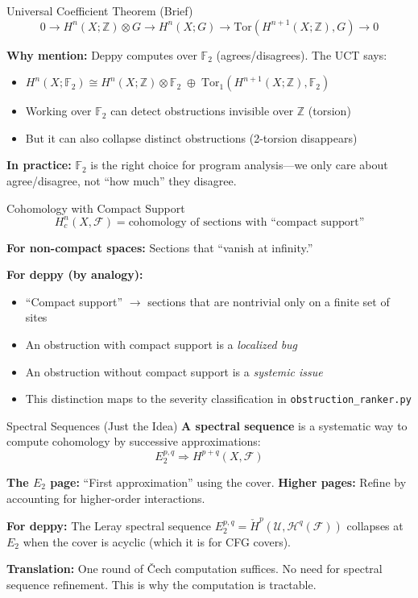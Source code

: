 \documentclass[aspectratio=169,10pt]{beamer}
\newcommand{\Fscr}{\mathcal{F}}
\newcommand{\Uscr}{\mathcal{U}}
\begin{document}
\begin{frame}{Universal Coefficient Theorem (Brief)}
\[
0 \to H^n(X; \mathbb{Z}) \otimes G \to H^n(X; G) \to \mathrm{Tor}(H^{n+1}(X; \mathbb{Z}), G) \to 0
\]

\textbf{Why mention:} Deppy computes over $\mathbb{F}_2$ (agrees/disagrees). The UCT says:
\begin{itemize}
  \item $H^n(X; \mathbb{F}_2) \cong H^n(X; \mathbb{Z}) \otimes \mathbb{F}_2 \;\oplus\; \text{Tor}_1(H^{n+1}(X; \mathbb{Z}), \mathbb{F}_2)$
  \item Working over $\mathbb{F}_2$ can detect obstructions invisible over $\mathbb{Z}$ (torsion)
  \item But it can also collapse distinct obstructions (2-torsion disappears)
\end{itemize}

\textbf{In practice:} $\mathbb{F}_2$ is the right choice for program analysis---we only care about agree/disagree, not ``how much'' they disagree.
\end{frame}

\begin{frame}{Cohomology with Compact Support}
\[
H^n_c(X, \Fscr) = \text{cohomology of sections with ``compact support''}
\]

\textbf{For non-compact spaces:} Sections that ``vanish at infinity.''

\textbf{For deppy (by analogy):}
\begin{itemize}
  \item ``Compact support'' $\to$ sections that are nontrivial only on a finite set of sites
  \item An obstruction with compact support is a \emph{localized bug}
  \item An obstruction without compact support is a \emph{systemic issue}
  \item This distinction maps to the severity classification in \texttt{obstruction\_ranker.py}
\end{itemize}
\end{frame}

\begin{frame}{Spectral Sequences (Just the Idea)}
\textbf{A spectral sequence} is a systematic way to compute cohomology by successive approximations:
\[
E_2^{p,q} \Rightarrow H^{p+q}(X, \Fscr)
\]

\textbf{The $E_2$ page:} ``First approximation'' using the cover.
\textbf{Higher pages:} Refine by accounting for higher-order interactions.

\vspace{0.3em}
\textbf{For deppy:} The Leray spectral sequence $E_2^{p,q} = \check{H}^p(\Uscr, \mathcal{H}^q(\Fscr))$ collapses at $E_2$ when the cover is acyclic (which it is for CFG covers).

\textbf{Translation:} One round of \v{C}ech computation suffices. No need for spectral sequence refinement. This is why the computation is tractable.
\end{frame}
\end{document}
